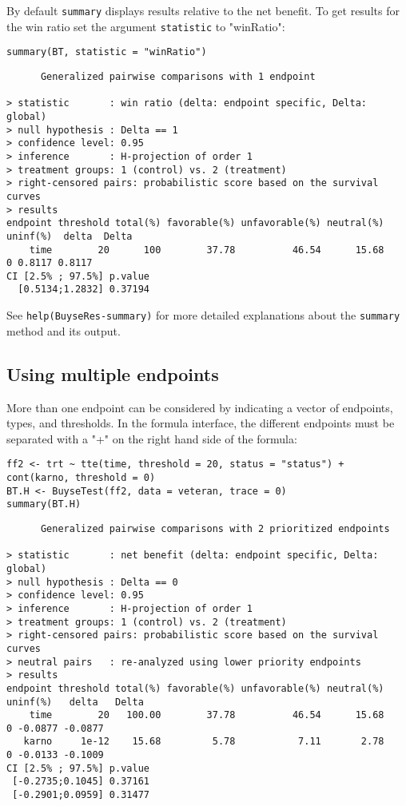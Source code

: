 \documentclass[12pt]{article}
\begin{document}
\bigskip

By default \texttt{summary} displays results relative to the net benefit. To
get results for the win ratio set the argument \texttt{statistic} to
"winRatio":
\lstset{language=r,label= ,caption= ,captionpos=b,numbers=none}
\begin{lstlisting}
summary(BT, statistic = "winRatio")
\end{lstlisting}

\begin{verbatim}
      Generalized pairwise comparisons with 1 endpoint

> statistic       : win ratio (delta: endpoint specific, Delta: global) 
> null hypothesis : Delta == 1 
> confidence level: 0.95 
> inference       : H-projection of order 1
> treatment groups: 1 (control) vs. 2 (treatment) 
> right-censored pairs: probabilistic score based on the survival curves
> results
endpoint threshold total(%) favorable(%) unfavorable(%) neutral(%) uninf(%)  delta  Delta
    time        20      100        37.78          46.54      15.68        0 0.8117 0.8117
CI [2.5% ; 97.5%] p.value 
  [0.5134;1.2832] 0.37194
\end{verbatim}

See \texttt{help(BuyseRes-summary)} for more detailed explanations about the
\texttt{summary} method and its output.

\clearpage

\subsection{Using multiple endpoints}
\label{sec:org13093c6}
More than one endpoint can be considered by indicating a vector of
endpoints, types, and thresholds. In the formula interface, the
different endpoints must be separated with a "+" on the right hand
side of the formula:
\lstset{language=r,label= ,caption= ,captionpos=b,numbers=none}
\begin{lstlisting}
ff2 <- trt ~ tte(time, threshold = 20, status = "status") + cont(karno, threshold = 0)
BT.H <- BuyseTest(ff2, data = veteran, trace = 0)
summary(BT.H)
\end{lstlisting}

\begin{verbatim}
      Generalized pairwise comparisons with 2 prioritized endpoints

> statistic       : net benefit (delta: endpoint specific, Delta: global) 
> null hypothesis : Delta == 0 
> confidence level: 0.95 
> inference       : H-projection of order 1
> treatment groups: 1 (control) vs. 2 (treatment) 
> right-censored pairs: probabilistic score based on the survival curves
> neutral pairs   : re-analyzed using lower priority endpoints
> results
endpoint threshold total(%) favorable(%) unfavorable(%) neutral(%) uninf(%)   delta   Delta
    time        20   100.00        37.78          46.54      15.68        0 -0.0877 -0.0877
   karno     1e-12    15.68         5.78           7.11       2.78        0 -0.0133 -0.1009
CI [2.5% ; 97.5%] p.value 
 [-0.2735;0.1045] 0.37161 
 [-0.2901;0.0959] 0.31477
\end{verbatim}
\end{document}
